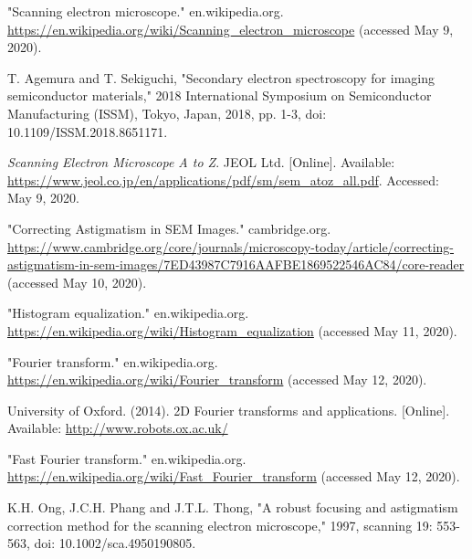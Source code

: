 \documentclass[conference]{IEEEtran}
\begin{document}
\begin{thebibliography}{00}
    "Scanning electron microscope." en.wikipedia.org. \url{https://en.wikipedia.org/wiki/Scanning_electron_microscope} (accessed May 9, 2020).

    T. Agemura and T. Sekiguchi, "Secondary electron spectroscopy for imaging semiconductor materials," 2018 International Symposium on Semiconductor Manufacturing (ISSM), Tokyo, Japan, 2018, pp. 1-3, doi: 10.1109/ISSM.2018.8651171.

    \textit{Scanning Electron Microscope A to Z}. JEOL Ltd. [Online]. Available: \url{https://www.jeol.co.jp/en/applications/pdf/sm/sem_atoz_all.pdf}. Accessed: May 9, 2020.

    "Correcting Astigmatism in SEM Images." cambridge.org. \url{https://www.cambridge.org/core/journals/microscopy-today/article/correcting-astigmatism-in-sem-images/7ED43987C7916AAFBE1869522546AC84/core-reader} (accessed May 10, 2020).

    "Histogram equalization." en.wikipedia.org. \url{https://en.wikipedia.org/wiki/Histogram_equalization} (accessed May 11, 2020).

    "Fourier transform." en.wikipedia.org. \url{https://en.wikipedia.org/wiki/Fourier_transform} (accessed May 12, 2020).

    University of Oxford. (2014). 2D Fourier transforms and applications. [Online]. Available: \url{http://www.robots.ox.ac.uk/}

    "Fast Fourier transform." en.wikipedia.org. \url{https://en.wikipedia.org/wiki/Fast_Fourier_transform} (accessed May 12, 2020).

    K.H. Ong, J.C.H. Phang and J.T.L. Thong, "A robust focusing and astigmatism correction method for the scanning electron microscope," 1997, scanning 19: 553-563, doi: 10.1002/sca.4950190805.
\end{thebibliography}
\end{document}
